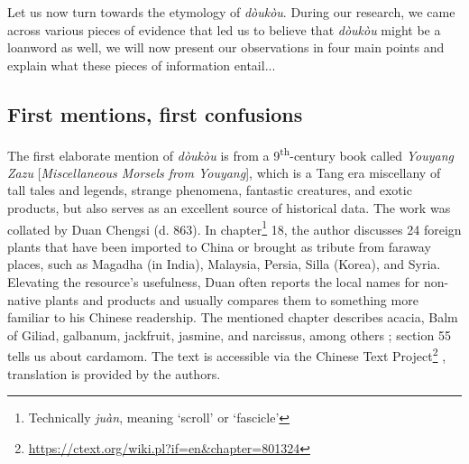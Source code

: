 \documentclass[12pt]{article}
\newcommand{\tc}[1]{\traditionalchinesefont{#1}\rmfamily}
\begin{document}


Let us now turn towards the etymology of \textit{dòukòu}. During our research, we came across various pieces of evidence that led us to believe that \textit{dòukòu} might be a loanword as well, we will now present our observations in four main points and explain what these pieces of information entail...

\subsection{First mentions, first confusions}



The first elaborate mention of \tc{豆蔻} \textit{dòukòu} is from a 9\textsuperscript{th}-century book called \tc{酉陽雜俎} \textit{Youyang Zazu} [\textit{Miscellaneous Morsels from Youyang}], which is a Tang era miscellany of tall tales and legends, strange phenomena, fantastic creatures, and exotic products, but also serves as an excellent source of historical data. The work was collated by Duan Chengsi (d. 863). In chapter\footnote{Technically \textit{juàn}, meaning `scroll' or `fascicle'} 18, the author discusses 24 foreign plants that have been imported to China or brought as tribute from faraway places, such as Magadha (in India), Malaysia, Persia, Silla (Korea), and Syria. Elevating the resource's usefulness, Duan often reports the local names for non-native plants and products and usually compares them to something more familiar to his Chinese readership. The mentioned chapter describes acacia, Balm of Giliad, galbanum, jackfruit, jasmine, and narcissus, among others \parencite{reed_2003_tang}; section 55 tells us about cardamom. The text is accessible via the Chinese Text Project\footnote{\url{https://ctext.org/wiki.pl?if=en&chapter=801324}} \parencite{sturgeon_2021_chinese}, translation is provided by the authors.
\end{document}
